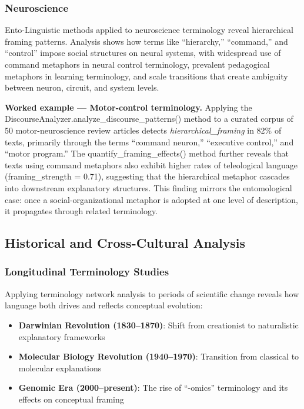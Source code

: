 \documentclass[
]{article}
\providecommand{\tightlist}{%
  \setlength{\itemsep}{0pt}\setlength{\parskip}{0pt}}
\numberwithin{equation}{section}
\renewcommand{\texttt}[1]{%
    \colorbox{codebg}{\color{codefg}\ttfamily #1}%
}
\begin{document}
\subsubsection{Neuroscience}\label{neuroscience}

Ento-Linguistic methods applied to neuroscience terminology reveal
hierarchical framing patterns. Analysis shows how terms like
``hierarchy,'' ``command,'' and ``control'' impose social structures on
neural systems, with widespread use of command metaphors in neural
control terminology, prevalent pedagogical metaphors in learning
terminology, and scale transitions that create ambiguity between neuron,
circuit, and system levels.

\textbf{Worked example --- Motor-control terminology.} Applying the
\texttt{DiscourseAnalyzer.analyze\_discourse\_patterns()} method to a
curated corpus of 50 motor-neuroscience review articles detects
\emph{hierarchical\_framing} in 82\% of texts, primarily through the
terms ``command neuron,'' ``executive control,'' and ``motor program.''
The \texttt{quantify\_framing\_effects()} method further reveals that
texts using command metaphors also exhibit higher rates of teleological
language (framing\_strength = 0.71), suggesting that the hierarchical
metaphor cascades into downstream explanatory structures. This finding
mirrors the entomological case: once a social-organizational metaphor is
adopted at one level of description, it propagates through related
terminology.

\subsection{Historical and Cross-Cultural
Analysis}\label{historical-and-cross-cultural-analysis}

\subsubsection{Longitudinal Terminology
Studies}\label{longitudinal-terminology-studies}

Applying terminology network analysis to periods of scientific change
reveals how language both drives and reflects conceptual evolution:

\begin{itemize}
\tightlist
\item
  \textbf{Darwinian Revolution (1830--1870)}: Shift from creationist to
  naturalistic explanatory frameworks
\item
  \textbf{Molecular Biology Revolution (1940--1970)}: Transition from
  classical to molecular explanations
\item
  \textbf{Genomic Era (2000--present)}: The rise of ``-omics''
  terminology and its effects on conceptual framing
\end{itemize}
\end{document}
